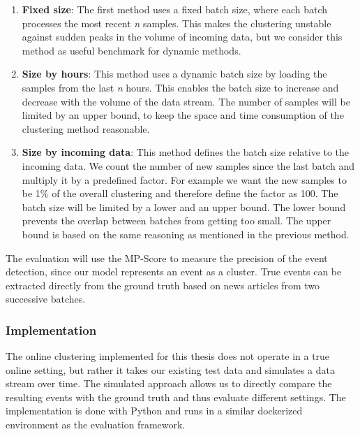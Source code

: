 \begin{enumerate}
    \item \textbf{Fixed size}: The first method uses a fixed batch size,
          where each batch processes the most recent \textit{n} samples.
          This makes the clustering unstable against sudden peaks in the volume of incoming data,
          but we consider this method as useful benchmark for dynamic methods.
    \item \textbf{Size by hours}: This method uses a dynamic batch size
          by loading the samples from the last \textit{n} hours.
          This enables the batch size to increase and decrease with the volume of the data stream.
          The number of samples will be limited by an upper bound,
          to keep the space and time consumption of the clustering method reasonable.
    \item \textbf{Size by incoming data}: This method defines the batch size relative to the incoming data.
          We count the number of new samples since the last batch and multiply it by a predefined factor.
          For example we want the new samples to be 1\%
          of the overall clustering and therefore define the factor as 100.
          The batch size will be limited by a lower and an upper bound.
          The lower bound prevents the overlap between batches from getting too small.
          The upper bound is based on the same reasoning as mentioned in the previous method.
\end{enumerate}

The evaluation will use the MP-Score to measure the precision of the event detection,
since our model represents an event as a cluster.
True events can be extracted directly from the ground truth based on news articles from two successive batches.

\subsubsection{Implementation}
\label{subsubsec:4c_implementation}

The online clustering implemented for this thesis does not operate in a true online setting,
but rather it takes our existing test data and simulates a data stream over time.
The simulated approach allows us to directly compare the resulting events
with the ground truth and thus evaluate different settings.
The implementation is done with Python and runs in a similar dockerized environment as the evaluation framework.


